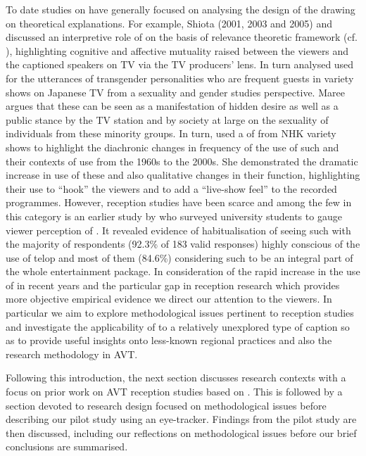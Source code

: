 \documentclass[output=paper]{langsci/langscibook}
\begin{document}
To date studies on  have generally focused on analysing the design of the  drawing on theoretical explanations. For example, Shiota (2001, 2003 and 2005) and \citet{Sasamoto2014} discussed an interpretive role of  on the basis of relevance theoretic framework (cf. \citealt{Sperber1986second}), highlighting cognitive and affective mutuality raised between the viewers and the captioned speakers on TV via the TV producers' lens. In turn \citet{Maree2014} analysed  used for the utterances of transgender personalities who are frequent guests in variety shows on Japanese TV from a sexuality and gender studies perspective. Maree argues that these  can be seen as a manifestation of hidden desire as well as a public stance by the TV station and by society at large on the sexuality of individuals from these minority groups. In turn, \citet{Shitara2012} used a  of  from NHK variety shows to highlight the diachronic changes in frequency of the use of such  and their contexts of use from the 1960s to the 2000s. She demonstrated the dramatic increase in use of these  and also qualitative changes in their function, highlighting their use to ``hook'' the viewers and to add a ``live-show feel'' to the recorded programmes. However, reception studies have been scarce and among the few in this category is an earlier study by \citet{Kimura2000} who surveyed university students to gauge viewer perception of . It revealed evidence of habitualisation of seeing such  with the majority of respondents (92.3\% of 183 valid responses) highly conscious of the use of telop and most of them (84.6\%) considering such  to be an integral part of the whole entertainment package. In consideration of the rapid increase in the use of  in recent years \citep[50]{Kato2012} and the particular gap in reception research which provides more objective empirical evidence we direct our attention to the viewers. In particular we aim to explore methodological issues pertinent to reception studies and investigate the applicability of  to a relatively unexplored type of caption so as to provide useful insights onto less-known regional practices and also the research methodology in AVT.  



Following this introduction, the next section discusses research contexts with a focus on prior work on AVT reception studies based on . This is followed by a section devoted to research design focused on methodological issues before describing our pilot study using an eye-tracker. Findings from the pilot study are then discussed, including our reflections on methodological issues before our brief conclusions are summarised. 
\end{document}
